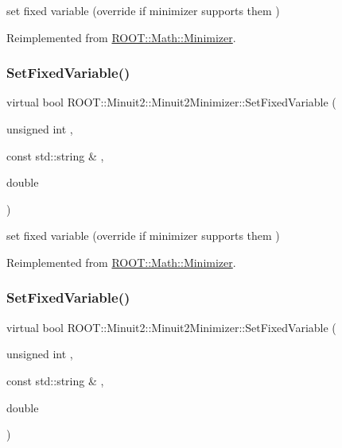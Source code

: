 set fixed variable (override if minimizer supports them ) 



Reimplemented from \mbox{\hyperlink{classROOT_1_1Math_1_1Minimizer_a063e9d83c8a61afc8798ebb1d74b6f2b}{R\+O\+O\+T\+::\+Math\+::\+Minimizer}}.

\mbox{\label{classROOT_1_1Minuit2_1_1Minuit2Minimizer_af42341b80ebb02d8c0882beaa781e7bd}} 
\subsubsection{\texorpdfstring{SetFixedVariable()}{SetFixedVariable()}\hspace{0.1cm}{\footnotesize\ttfamily [2/3]}}
{\footnotesize\ttfamily virtual bool R\+O\+O\+T\+::\+Minuit2\+::\+Minuit2\+Minimizer\+::\+Set\+Fixed\+Variable (\begin{DoxyParamCaption}\item[{unsigned int}]{,  }\item[{const std\+::string \&}]{,  }\item[{double}]{ }\end{DoxyParamCaption})\hspace{0.3cm}{\ttfamily [virtual]}}



set fixed variable (override if minimizer supports them ) 



Reimplemented from \mbox{\hyperlink{classROOT_1_1Math_1_1Minimizer_a063e9d83c8a61afc8798ebb1d74b6f2b}{R\+O\+O\+T\+::\+Math\+::\+Minimizer}}.

\mbox{\label{classROOT_1_1Minuit2_1_1Minuit2Minimizer_af42341b80ebb02d8c0882beaa781e7bd}} 
\subsubsection{\texorpdfstring{SetFixedVariable()}{SetFixedVariable()}\hspace{0.1cm}{\footnotesize\ttfamily [3/3]}}
{\footnotesize\ttfamily virtual bool R\+O\+O\+T\+::\+Minuit2\+::\+Minuit2\+Minimizer\+::\+Set\+Fixed\+Variable (\begin{DoxyParamCaption}\item[{unsigned int}]{,  }\item[{const std\+::string \&}]{,  }\item[{double}]{ }\end{DoxyParamCaption})\hspace{0.3cm}{\ttfamily [virtual]}}



